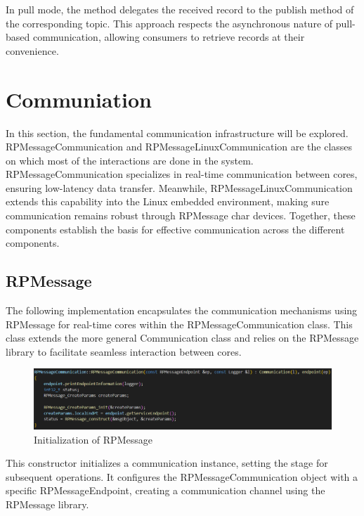 In pull mode, the method delegates the received record to the publish method
of the corresponding topic.
This approach respects the asynchronous nature of pull-based communication,
allowing consumers to retrieve records at their convenience.

\section{Communiation}

In this section, the fundamental communication infrastructure will be explored.
RPMessageCommunication and RPMessageLinuxCommunication are the classes on which
most of the interactions are done in the system.
RPMessageCommunication specializes in real-time communication between cores,
ensuring low-latency data transfer.
Meanwhile, RPMessageLinuxCommunication extends this capability into the Linux
embedded environment, making sure communication remains robust through
RPMessage char devices.
Together, these components establish the basis for effective communication
across the different components.

\subsection{RPMessage}

The following implementation encapsulates the communication mechanisms using
RPMessage for real-time cores within the RPMessageCommunication class.
This class extends the more general Communication class and relies on the
RPMessage library to facilitate seamless interaction between cores. 

\begin{figure}[H]
    \centering
    \includegraphics[width=1.0\textwidth]{Figures/implementation_rpmessage_init.png}
    \caption{Initialization of RPMessage}
\end{figure}

This constructor initializes a communication instance, setting the stage for
subsequent operations. It configures the RPMessageCommunication object with a
specific RPMessageEndpoint, creating a communication channel using the
RPMessage library.

